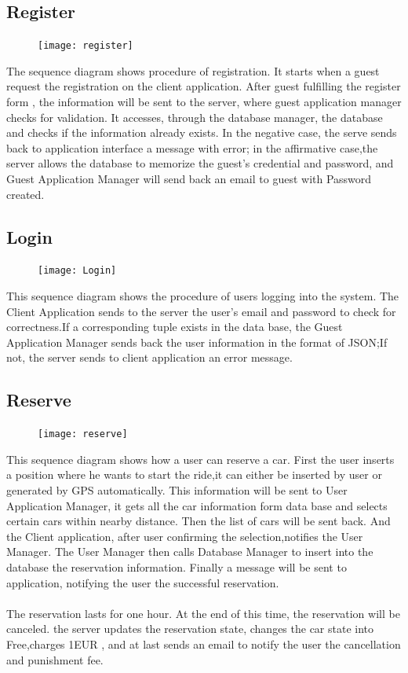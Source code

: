 \documentclass{article}
\begin{document}
	\subsection{Register}
	\begin{figure}[h]
		\texttt{[image: register]}
	\end{figure}
	The sequence diagram shows procedure of registration. It starts when a guest request the registration on the client application. After guest fulfilling the register form , the information will be sent to the server, where guest application manager checks for validation. It accesses, through the database manager, the database and checks if the information already exists. In the negative case, the serve sends back to application interface a message with error; in the affirmative case,the server allows the database to memorize the guest's credential and password, and Guest Application Manager will send back an email to guest with Password created.   
	
	\newpage
	\subsection{Login}
	\begin{figure}[h]
		\texttt{[image: Login]}
	\end{figure}
	This sequence diagram shows the procedure of users  logging into the system. The Client Application sends to the server  the user's email and password to check for correctness.If a corresponding tuple exists in the data base, the Guest Application Manager sends back the user information in the format of JSON;If not, the server sends to client application an error message.
	\newpage
	\subsection{Reserve}
	\begin{figure}[h]
		\texttt{[image: reserve]}
	\end{figure}
	This sequence diagram shows how a user can reserve a car. First the user inserts a position where he wants to start the ride,it can either be inserted by user or generated by GPS automatically. This information will be sent to User Application Manager, it gets all the car information form data base and selects certain cars within nearby distance. Then the list of cars will be sent back. And the Client  application, after user confirming the selection,notifies the User Manager. The User Manager then  calls Database Manager to insert into the database the reservation information. Finally a message will be sent to application, notifying the user the successful reservation.\\
	\\The reservation lasts for one hour. At the end of this time, the reservation will be canceled. the server updates the reservation state, changes the car state into Free,charges 1EUR , and at last sends an email to notify the user the cancellation and punishment fee.
	
\end{document}
